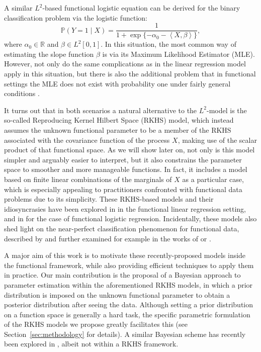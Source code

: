 \documentclass[ba]{imsart}
\numberwithin{equation}{section}
\theoremstyle{plain}
\newcommand{\R}{\mathbb{R}}
\newcommand\dotprod[2]{\left\langle #1, #2 \right\rangle}
\begin{document}
A similar \(L^2\)-based functional logistic equation can be derived for the binary classification problem via the logistic function:
\begin{equation}\label{eq:l2-logistic-model}
  \mathbb P(Y=1 \mid X) = \frac{1}{1 + \exp\{-\alpha_0 - \dotprod{X}{\beta}\}},
\end{equation}
where \(\alpha_0 \in \R\) and \(\beta \in L^2[0, 1]\). In this situation, the most common way of estimating the slope function \(\beta\) is via its Maximum Likelihood Estimator (MLE). However, not only do the same complications as in the linear regression model apply in this situation, but there is also the additional problem that in functional settings the MLE does not exist with probability one under fairly general conditions \citep[see][Sec.~3.2]{berrendero2018functional}.

It turns out that in both scenarios a natural alternative to the \(L^2\)-model is the so-called Reproducing Kernel Hilbert Space (RKHS) model, which instead assumes the unknown functional parameter to be a member of the RKHS associated with the covariance function of the process \(X\), making use of the scalar product of that functional space. As we will show later on, not only is this model simpler and arguably easier to interpret, but it also constrains the parameter space to smoother and more manageable functions. In fact, it includes a model based on finite linear combinations of the marginals of \(X\) as a particular case, which is especially appealing to practitioners confronted with functional data problems due to its simplicity. These RKHS-based models and their idiosyncrasies have been explored in \citet{berrendero2019rkhs, berrendero2020general} in the functional linear regression setting, and in \citet{berrendero2018functional, berrendero2018use} for the case of functional logistic regression. Incidentally, these models also shed light on the near-perfect classification phenomenon for functional data, described by \citet{delaigle2012achieving} and further examined for example in the works of \citet{berrendero2018use} or \citet{torrecilla2020optimal}.

A major aim of this work is to motivate these recently-proposed models inside the functional framework, while also providing efficient techniques to apply them in practice. Our main contribution is the proposal of a Bayesian approach to parameter estimation within the aforementioned RKHS models, in which a prior distribution is imposed on the unknown functional parameter to obtain a posterior distribution after seeing the data. Although setting a prior distribution on a function space is generally a hard task, the specific parametric formulation of the RKHS models we propose greatly facilitates this (see Section~\ref{sec:methodology} for details). A similar Bayesian scheme has recently been explored in \citet{grollemund2019bayesian}, albeit not within a RKHS framework.
\end{document}
